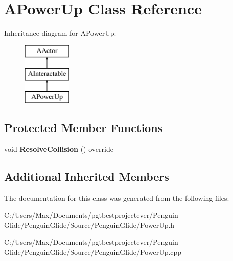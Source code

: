 \hypertarget{class_a_power_up}{}\section{A\+Power\+Up Class Reference}
\label{class_a_power_up}
Inheritance diagram for A\+Power\+Up\+:\begin{figure}[H]
\begin{center}
\leavevmode
\includegraphics[height=3.000000cm]{class_a_power_up}
\end{center}
\end{figure}
\subsection*{Protected Member Functions}
\begin{DoxyCompactItemize}
\item 
\mbox{\label{class_a_power_up_ae8a3c55a1833a816ccc320c91df19764}} 
void {\bfseries Resolve\+Collision} () override
\end{DoxyCompactItemize}
\subsection*{Additional Inherited Members}


The documentation for this class was generated from the following files\+:\begin{DoxyCompactItemize}
\item 
C\+:/\+Users/\+Max/\+Documents/pgtbestprojectever/\+Penguin Glide/\+Penguin\+Glide/\+Source/\+Penguin\+Glide/Power\+Up.\+h\item 
C\+:/\+Users/\+Max/\+Documents/pgtbestprojectever/\+Penguin Glide/\+Penguin\+Glide/\+Source/\+Penguin\+Glide/Power\+Up.\+cpp\end{DoxyCompactItemize}
